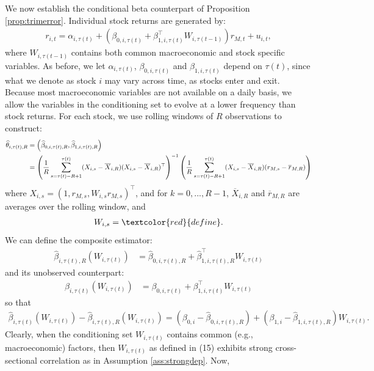 We now establish the conditional beta counterpart of Proposition \ref{prop:trimerror}. Individual stock returns are generated by:
\begin{align}
r_{i,t} = \alpha_{i,\tau(t)} + \left( \beta_{0,i,\tau(t)} + \beta_{1,i,\tau(t)}^{\top} W_{i,\tau(t-1)} \right) r_{M,t} + u_{i,t},
\end{align}
where $W_{i,\tau(t-1)}$ contains both common macroeconomic and stock specific variables. As before, we let $\alpha_{i,\tau(t)}$, $\beta_{0,i,\tau(t)}$ and $\beta_{1,i,\tau(t)}$ depend on $\tau(t)$, since what we denote as stock $i$ may vary across time, as stocks enter and exit. Because most macroeconomic variables are not available on a daily basis, we allow the variables in the conditioning set to evolve at a lower frequency than stock returns. For each stock, we use rolling windows of $R$ observations to construct:
\begin{align}
\widehat{\theta}_{i,\tau(t),R} &= \left( \widehat{\beta}_{0,i,\tau(t),R}, \widehat{\beta}_{1,i,\tau(t),R} \right) \\
&= \left( \frac{1}{R} \sum_{s=\tau(t)-R+1}^{\tau(t)} (X_{i,s} - \overline{X}_{i,R}) (X_{i,s} - \overline{X}_{i,R})^{\top} \right)^{-1} \left( \frac{1}{R} \sum_{s=\tau(t)-R+1}^{\tau(t)} (X_{i,s} - \overline{X}_{i,R}) (r_{M,s} - \overline{r}_{M,R}) \right) \notag
\end{align}
where $X_{i,s} = (1, r_{M,s}, W_{i,s} r_{M,s})^\top$, and for $k = 0, ..., R - 1$, $\overline{X}_{i,R}$ and $\overline{r}_{M,R}$ are averages over the rolling window, and
\begin{align}
W_{i,s} = \textcolor{red}{define}.
\end{align}
We can define the composite estimator:
\begin{align}
\widehat{\beta}_{i,\tau(t),R} (W_{i,\tau(t)}) &= \widehat{\beta}_{0,i,\tau(t),R} + \widehat{\beta}_{1,i,\tau(t),R}^\top W_{i,\tau(t)}
\end{align}
and its unobserved counterpart:
\begin{align}
\beta_{i,\tau(t)} (W_{i,\tau(t)}) &= \beta_{0,i,\tau(t)} + \beta_{1,i,\tau(t)}^\top W_{i,\tau(t)}
\end{align}
so that
\begin{align}
\widehat{\beta}_{i,\tau(t)} (W_{i,\tau(t)}) - \widehat{\beta}_{i,\tau(t),R} (W_{i,\tau(t)}) = (\beta_{0,i} - \widehat{\beta}_{0,i,\tau(t),R}) + (\beta_{1,i} - \widehat{\beta}_{1,i,\tau(t),R}) W_{i,\tau(t)}.
\end{align}
Clearly, when the conditioning set $W_{i,\tau(t)}$ contains common (e.g., macroeconomic) factors, then $W_{i,\tau(t)}$ as defined in (15) exhibits strong cross-sectional correlation as in Assumption \ref{ass:strongdep}. Now,
